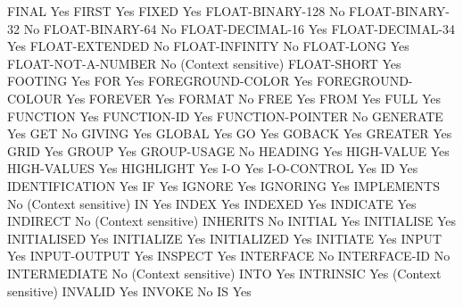 FINAL                           Yes
FIRST                           Yes
FIXED                           Yes
FLOAT-BINARY-128                No
FLOAT-BINARY-32                 No
FLOAT-BINARY-64                 No
FLOAT-DECIMAL-16                Yes
FLOAT-DECIMAL-34                Yes
FLOAT-EXTENDED                  No
FLOAT-INFINITY                  No
FLOAT-LONG                      Yes
FLOAT-NOT-A-NUMBER              No (Context sensitive)
FLOAT-SHORT                     Yes
FOOTING                         Yes
FOR                             Yes
FOREGROUND-COLOR                Yes
FOREGROUND-COLOUR               Yes
FOREVER                         Yes
FORMAT                          No
FREE                            Yes
FROM                            Yes
FULL                            Yes
FUNCTION                        Yes
FUNCTION-ID                     Yes
FUNCTION-POINTER                No
GENERATE                        Yes
GET                             No
GIVING                          Yes
GLOBAL                          Yes
GO                              Yes
GOBACK                          Yes
GREATER                         Yes
GRID                            Yes
GROUP                           Yes
GROUP-USAGE                     No
HEADING                         Yes
HIGH-VALUE                      Yes
HIGH-VALUES                     Yes
HIGHLIGHT                       Yes
I-O                             Yes
I-O-CONTROL                     Yes
ID                              Yes
IDENTIFICATION                  Yes
IF                              Yes
IGNORE                          Yes
IGNORING                        Yes
IMPLEMENTS                      No (Context sensitive)
IN                              Yes
INDEX                           Yes
INDEXED                         Yes
INDICATE                        Yes
INDIRECT                        No (Context sensitive)
INHERITS                        No
INITIAL                         Yes
INITIALISE                      Yes
INITIALISED                     Yes
INITIALIZE                      Yes
INITIALIZED                     Yes
INITIATE                        Yes
INPUT                           Yes
INPUT-OUTPUT                    Yes
INSPECT                         Yes
INTERFACE                       No
INTERFACE-ID                    No
INTERMEDIATE                    No (Context sensitive)
INTO                            Yes
INTRINSIC                       Yes (Context sensitive)
INVALID                         Yes
INVOKE                          No
IS                              Yes
